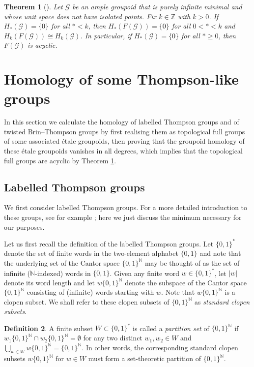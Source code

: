 \documentclass[10pt,a4paper]{amsart}
\numberwithin{equation}{section}
\numberwithin{figure}{section}
\newtheorem{thm}{Theorem}[section]
\theoremstyle{definition}
\newtheorem{defn}[thm]{Definition}
\newcommand{\cG}{\mathcal{G}}
\newcommand{\bN}{\mathbb{N}}
\newcommand{\bZ}{\mathbb{Z}}
\renewcommand{\geq}{\geqslant}
\begin{document}
\begin{thm}[{\cite[Corollary D]{Li2024}}]
\label{thm:homgy-groupoid-fullgroup}
Let $\cG$ be an ample groupoid that is purely infinite minimal and whose unit space does not have isolated points.
Fix $k\in \bZ$ with $k > 0$. If $H_\ast(\cG) = \{0\}$ for all $\ast<k$, then $H_\ast(F(\cG)) = \{0\}$ for all $0<\ast<k$ and $H_k(F(\cG)) \cong H_k(\cG)$. In particular, if $H_\ast(\cG) = \{0\}$ for all $\ast \geq 0$, then $F(\cG)$ is acyclic.
\end{thm}


\section{Homology of some Thompson-like groups}
\label{section:proofs-of-theorems}

In this section we calculate the homology of labelled Thompson groups and of twisted Brin--Thompson groups by first realising them as topological full groups of some associated étale groupoids, then proving that the groupoid homology of these étale groupoids vanishes in all degrees, which implies that the topological full groups are acyclic by Theorem \ref{thm:homgy-groupoid-fullgroup}.


\subsection{Labelled Thompson groups}
\label{subsection:label-thom}

We first consider labelled Thompson groups. For a more detailed introduction to these groups, see for example \cite[\S 1]{WuWuZhaoZhou2025}; here we just discuss the minimum necessary for our purposes.

Let us first recall the definition of the labelled Thompson groups. Let $\{0,1\}^*$ denote the set of finite words in the two-element alphabet $\{0,1\}$ and note that the underlying set of the Cantor space $\{0,1\}^{\bN}$ may be thought of as the set of infinite ($\bN$-indexed) words in $\{0,1\}$. Given any finite word $w \in \{0,1\}^*$, let $\lvert w\rvert$ denote its word length and let $w\{0,1\}^{\bN}$ denote the subspace of the Cantor space $\{0,1\}^{\bN}$ consisting of (infinite) words starting with $w$. Note that $w\{0,1\}^{\bN}$ is a clopen subset. We shall refer to these clopen subsets of $\{0,1\}^{\bN}$ as \emph{standard clopen subsets}.

\begin{defn}
A finite subset $W \subset \{0,1\}^*$ is called a \emph{partition set} of $\{0,1\}^\bN$ if $w_1\{0,1\}^{\bN} \cap w_2\{0,1\}^{\bN} = \emptyset$ for any two distinct $w_1,w_2\in W$ and $\bigcup_{w\in W} w\{0,1\}^\bN = \{0,1\}^{\bN}$. In other words, the corresponding standard clopen subsets $w\{0,1\}^\bN$ for $w \in W$ must form a set-theoretic partition of $\{0,1\}^\bN$.
\end{defn}
\end{document}
